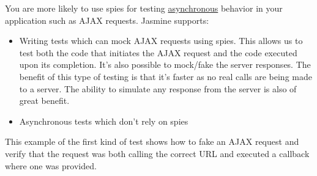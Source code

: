 \documentclass[9pt]{book}
\begin{document}
You are more likely to use spies for testing
\href{http://en.wikipedia.org/wiki/Asynchronous_communication}{asynchronous}
behavior in your application such as AJAX requests. Jasmine supports:

\begin{itemize}
\itemsep1pt\parskip0pt
\item
  Writing tests which can mock AJAX requests using spies. This allows us
  to test both the code that initiates the AJAX request and the code
  executed upon its completion. It's also possible to mock/fake the
  server responses. The benefit of this type of testing is that it's
  faster as no real calls are being made to a server. The ability to
  simulate any response from the server is also of great benefit.
\item
  Asynchronous tests which don't rely on spies
\end{itemize}

This example of the first kind of test shows how to fake an AJAX request
and verify that the request was both calling the correct URL and
executed a callback where one was provided.
\end{document}
